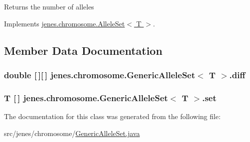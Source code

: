\begin{DoxyReturn}{Returns}
the number of alleles 
\end{DoxyReturn}


Implements \hyperlink{interfacejenes_1_1chromosome_1_1_allele_set_3_01_t_01_4_a3acbb10df92ebafc589d5d8546949f2f}{jenes.\-chromosome.\-Allele\-Set$<$ T $>$}.



\subsection{Member Data Documentation}
\hypertarget{classjenes_1_1chromosome_1_1_generic_allele_set_3_01_t_01_4_a6eef912e60066cc7271f44ecc704ce1c}{
\subsubsection[{diff}]{\setlength{\rightskip}{0pt plus 5cm}double \mbox{[}$\,$\mbox{]}\mbox{[}$\,$\mbox{]} jenes.\-chromosome.\-Generic\-Allele\-Set$<$ T $>$.diff\hspace{0.3cm}{\ttfamily [private]}}}\label{classjenes_1_1chromosome_1_1_generic_allele_set_3_01_t_01_4_a6eef912e60066cc7271f44ecc704ce1c}
\hypertarget{classjenes_1_1chromosome_1_1_generic_allele_set_3_01_t_01_4_a2594723bce2ac24a1d465de4732418bc}{
\subsubsection[{set}]{\setlength{\rightskip}{0pt plus 5cm}T \mbox{[}$\,$\mbox{]} jenes.\-chromosome.\-Generic\-Allele\-Set$<$ T $>$.set\hspace{0.3cm}{\ttfamily [private]}}}\label{classjenes_1_1chromosome_1_1_generic_allele_set_3_01_t_01_4_a2594723bce2ac24a1d465de4732418bc}


The documentation for this class was generated from the following file\-:\begin{DoxyCompactItemize}
\item 
src/jenes/chromosome/\hyperlink{_generic_allele_set_8java}{Generic\-Allele\-Set.\-java}\end{DoxyCompactItemize}
